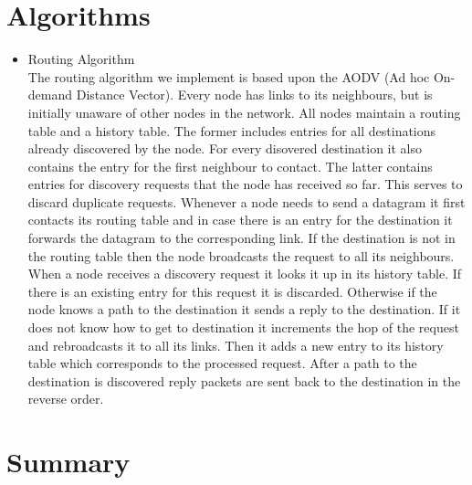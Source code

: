 \documentclass{book}
\begin{document}
\section{Algorithms}
\begin{itemize}
  \item Routing Algorithm\\
The routing algorithm we implement is based upon the AODV (Ad hoc On-demand
Distance Vector). Every node has links to its neighbours, but is initially
unaware of other nodes in the network. All nodes maintain a routing table 
and a history table. The former includes entries for all destinations already
 discovered by the node. For every disovered destination it also contains 
 the entry for the first neighbour to contact. The latter contains entries 
 for discovery requests that the node has received so far. This serves to 
 discard duplicate requests. Whenever a node needs to send a datagram it first 
 contacts its routing table and in case there is an entry for the destination
 it forwards the datagram to the corresponding link. If the destination is not
 in the routing table then the node broadcasts the request to all its
 neighbours. When a node receives a discovery request it looks it up in its
 history table. If there is an existing entry for this request it is discarded.
 Otherwise if the node knows a path to the destination it sends a reply to the
 destination. If it does not know how to get to destination it increments the hop
 of the request and rebroadcasts it to all its links. Then it adds a new entry to
 its history table which corresponds to the processed request. After a path to
 the destination is discovered reply packets are sent back to the destination
 in the reverse order.
 \end{itemize} 
\section{Summary}
\end{document}
